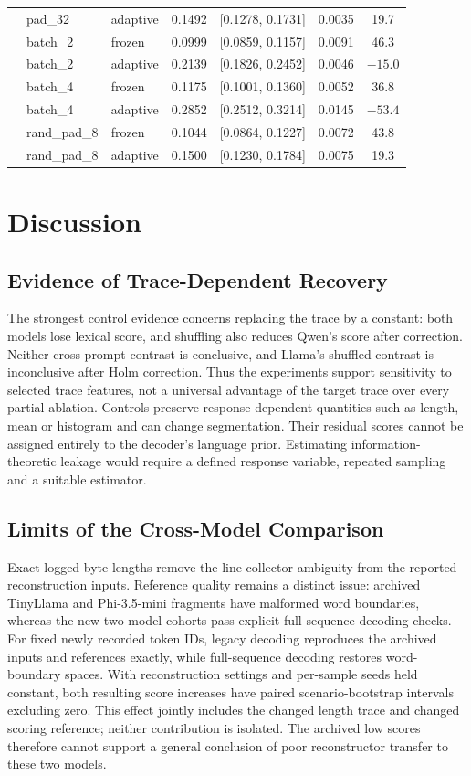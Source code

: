 \documentclass[electronics,article,submit,pdftex,moreauthors]{Definitions/mdpi}
\begin{document}
\begin{table}[ht]
{\begin{tabular}{l l l c c c c}
 & pad\_32 & adaptive & 0.1492 & [0.1278, 0.1731] & 0.0035 & 19.7 \\
 & batch\_2 & frozen & 0.0999 & [0.0859, 0.1157] & 0.0091 & 46.3 \\
 & batch\_2 & adaptive & 0.2139 & [0.1826, 0.2452] & 0.0046 & $-15.0$ \\
 & batch\_4 & frozen & 0.1175 & [0.1001, 0.1360] & 0.0052 & 36.8 \\
 & batch\_4 & adaptive & 0.2852 & [0.2512, 0.3214] & 0.0145 & $-53.4$ \\
 & rand\_pad\_8 & frozen & 0.1044 & [0.0864, 0.1227] & 0.0072 & 43.8 \\
 & rand\_pad\_8 & adaptive & 0.1500 & [0.1230, 0.1784] & 0.0075 & 19.3 \\
\bottomrule
\end{tabular}%
}
\end{table}

\section{Discussion}
\subsection{Evidence of Trace-Dependent Recovery}
The strongest control evidence concerns replacing the trace by a constant: both models lose lexical score, and shuffling also reduces Qwen's score after correction. Neither cross-prompt contrast is conclusive, and Llama's shuffled contrast is inconclusive after Holm correction. Thus the experiments support sensitivity to selected trace features, not a universal advantage of the target trace over every partial ablation. Controls preserve response-dependent quantities such as length, mean or histogram and can change segmentation. Their residual scores cannot be assigned entirely to the decoder's language prior. Estimating information-theoretic leakage would require a defined response variable, repeated sampling and a suitable estimator.

\subsection{Limits of the Cross-Model Comparison}
Exact logged byte lengths remove the line-collector ambiguity from the reported reconstruction inputs. Reference quality remains a distinct issue: archived TinyLlama and Phi-3.5-mini fragments have malformed word boundaries, whereas the new two-model cohorts pass explicit full-sequence decoding checks. For fixed newly recorded token IDs, legacy decoding reproduces the archived inputs and references exactly, while full-sequence decoding restores word-boundary spaces. With reconstruction settings and per-sample seeds held constant, both resulting score increases have paired scenario-bootstrap intervals excluding zero. This effect jointly includes the changed length trace and changed scoring reference; neither contribution is isolated. The archived low scores therefore cannot support a general conclusion of poor reconstructor transfer to these two models.
\end{document}
